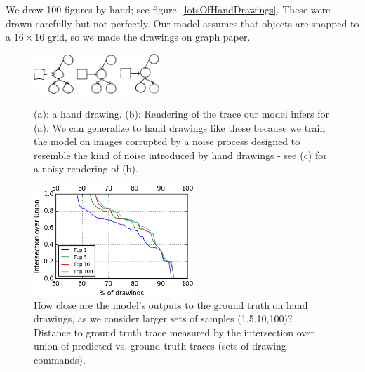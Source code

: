 \documentclass{article}
\begin{document}
We drew 100 figures by hand; see figure~\ref{lotsOfHandDrawings}.
These were drawn carefully but not perfectly.
Our model assumes that objects are snapped to a $16\times 16$ grid, so
we made the drawings on graph paper.
\begin{figure}\centering
  \begin{minipage}{0.45\textwidth}
  \begin{minipage}[t]{0.3\textwidth}\includegraphics[width = 1.5cm]{figures/expert-60-reduced.png}
    \subcaption{}
  \end{minipage}%
   \begin{minipage}[t]{0.3\textwidth}\includegraphics[width = 1.5cm]{figures/60-groundTruth-reduced.png}
    \subcaption{}
  \end{minipage}%
  \begin{minipage}[t]{0.3\textwidth}\includegraphics[width = 1.5cm]{figures/60-1-reduced.png}
    \subcaption{}
  \end{minipage}%
    \caption{(a): a hand drawing. (b): Rendering of the trace our model infers for (a). We can generalize to hand drawings like these because we train the model on images corrupted by a noise process designed to resemble the kind of noise introduced by hand drawings - see (c) for a noisy rendering of (b).}\label{handDrawingExamples}
  \end{minipage}\hfill
  \begin{minipage}{0.45\textwidth}
  \includegraphics[width = 6cm]{figures/drawingAccuracy.png}
  \caption{How close are the model's outputs to the ground truth on hand drawings, as we consider larger sets of samples (1,5,10,100)?
  Distance to ground truth trace measured by the intersection over union of predicted vs. ground truth traces (sets of drawing commands).}\label{drawingIntersectionOverUnion}
    \end{minipage}
\end{figure}
\end{document}
